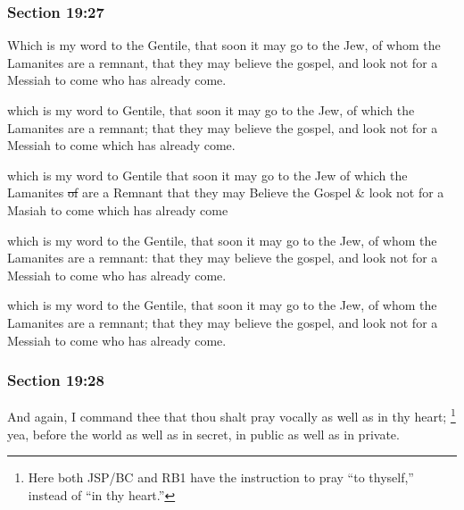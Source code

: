 	\subsubsection{Section 19:27} %
		\label{DC19-27}

		Which is my word to the Gentile, that soon it may go to the Jew, of whom the Lamanites are a remnant, that they may believe the gospel, and look not for a Messiah to come who has already come.

		\begin{framed}
		\scriptsize
			\begin{compactdesc}
				\item[JSP] which is my word to Gentile, that soon it may go to the Jew, of which the Lamanites are a remnant; that they may believe the gospel, and look not for a Messiah to come which has already come.
				\item[RB1] which is my word to Gentile that soon it may go to the Jew of which the Lamanites \sout{of} are a Remnant that they may Believe the Gospel \& look not for a Masiah to come which has already come
				\item[DC 1835] which is my word to the Gentile, that soon it may go to the Jew, of whom the Lamanites are a remnant: that they may believe the gospel, and look not for a Messiah to come who has already come.
				\item[DC 1844] which is my word to the Gentile, that soon it may go to the Jew, of whom the Lamanites are a remnant; that they may believe the gospel, and look not for a Messiah to come who has already come.
			\end{compactdesc}
		\end{framed}

	\subsubsection{Section 19:28} %
		\label{DC19-28}

		And again, I command thee that thou shalt pray vocally as well as in thy heart;%
			\footnote{%
				Here both JSP/BC and RB1 have the instruction to pray ``to thyself,'' instead of ``in thy heart.''
				}
		yea, before the world as well as in secret, in public as well as in private.

